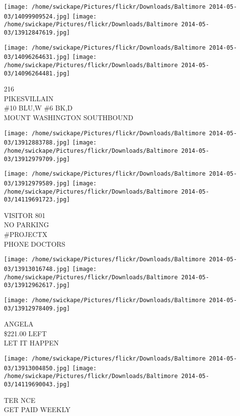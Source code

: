 \documentclass[10pt,letterpaper]{article}
\begin{document}
\texttt{[image: /home/swickape/Pictures/flickr/Downloads/Baltimore 2014-05-03/14099909524.jpg]}
\texttt{[image: /home/swickape/Pictures/flickr/Downloads/Baltimore 2014-05-03/13912847619.jpg]}

\texttt{[image: /home/swickape/Pictures/flickr/Downloads/Baltimore 2014-05-03/14096264631.jpg]}
\texttt{[image: /home/swickape/Pictures/flickr/Downloads/Baltimore 2014-05-03/14096264481.jpg]}

216\\
PIKESVILLAIN\\
\#10 BLU,W \#6 BK,D\\
MOUNT WASHINGTON SOUTHBOUND\\
\pagebreak

\texttt{[image: /home/swickape/Pictures/flickr/Downloads/Baltimore 2014-05-03/13912883788.jpg]}
\texttt{[image: /home/swickape/Pictures/flickr/Downloads/Baltimore 2014-05-03/13912979709.jpg]}

\texttt{[image: /home/swickape/Pictures/flickr/Downloads/Baltimore 2014-05-03/13912979589.jpg]}
\texttt{[image: /home/swickape/Pictures/flickr/Downloads/Baltimore 2014-05-03/14119691723.jpg]}

VISITOR 801\\
NO PARKING\\
\#PROJECTX\\
PHONE DOCTORS\\
\pagebreak

\texttt{[image: /home/swickape/Pictures/flickr/Downloads/Baltimore 2014-05-03/13913016748.jpg]}
\texttt{[image: /home/swickape/Pictures/flickr/Downloads/Baltimore 2014-05-03/13912962617.jpg]}

\vspace{0.25in}
\texttt{[image: /home/swickape/Pictures/flickr/Downloads/Baltimore 2014-05-03/13912978409.jpg]}

ANGELA\\
\$221.00 LEFT\\
LET IT HAPPEN\\
\pagebreak

\texttt{[image: /home/swickape/Pictures/flickr/Downloads/Baltimore 2014-05-03/13913004850.jpg]}
\texttt{[image: /home/swickape/Pictures/flickr/Downloads/Baltimore 2014-05-03/14119690043.jpg]}

TER NCE\\
GET PAID WEEKLY\\
\pagebreak
\end{document}

